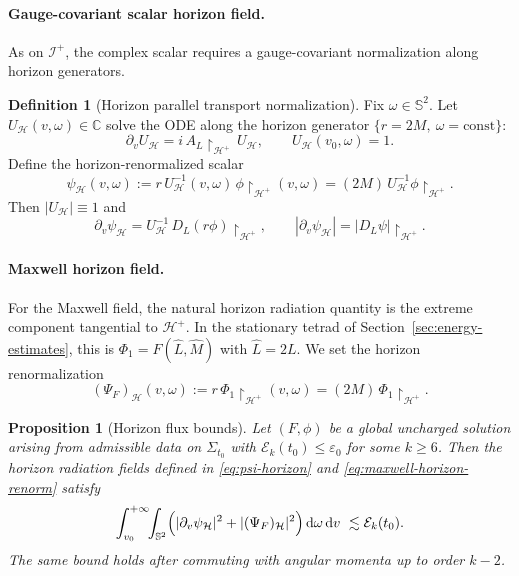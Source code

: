 \documentclass[11pt]{article}
\numberwithin{equation}{section}
\theoremstyle{plain}
\newtheorem{proposition}[theorem]{Proposition}
\theoremstyle{definition}
\newtheorem{definition}{Definition}[section]
\theoremstyle{remark}
\newcommand{\dd}{\mathrm{d}}
\begin{document}
\paragraph{Gauge-covariant scalar horizon field.}
As on $\mathcal I^+$, the complex scalar requires a gauge-covariant normalization along horizon generators.

\begin{definition}[Horizon parallel transport normalization]\label{def:horizon-parallel-transport}
Fix $\omega\in\mathbb S^{2}$.
Let $U_{\mathcal H}(v,\omega)\in\mathbb C$ solve the ODE along the horizon generator $\{r=2M,\ \omega=\mathrm{const}\}$:
\begin{equation}\label{eq:U-horizon}
\partial_v U_{\mathcal H} = i\,A_L\!\restriction_{\mathcal H^+}\,U_{\mathcal H},
\qquad
U_{\mathcal H}(v_0,\omega)=1.
\end{equation}
Define the horizon-renormalized scalar
\begin{equation}\label{eq:psi-horizon}
\psi_{\mathcal H}(v,\omega):= r\,U_{\mathcal H}^{-1}(v,\omega)\,\phi\!\restriction_{\mathcal H^+}(v,\omega)
= (2M)\,U_{\mathcal H}^{-1}\phi\!\restriction_{\mathcal H^+}.
\end{equation}
Then $|U_{\mathcal H}|\equiv 1$ and
\begin{equation}\label{eq:vpsi-horizon}
\partial_v \psi_{\mathcal H} = U_{\mathcal H}^{-1}\,D_L(r\phi)\!\restriction_{\mathcal H^+},
\qquad
|\partial_v\psi_{\mathcal H}| = |D_L\psi|\!\restriction_{\mathcal H^+}.
\end{equation}
\end{definition}

\paragraph{Maxwell horizon field.}
For the Maxwell field, the natural horizon radiation quantity is the extreme component tangential to $\mathcal H^+$.
In the stationary tetrad of Section~\ref{sec:energy-estimates}, this is $\Phi_{1}=F(\hat L,\hat M)$ with $\hat L=2L$.
We set the horizon renormalization
\begin{equation}\label{eq:maxwell-horizon-renorm}
(\Psi_F)_{\mathcal H}(v,\omega):= r\,\Phi_{1}\!\restriction_{\mathcal H^+}(v,\omega)=(2M)\,\Phi_{1}\!\restriction_{\mathcal H^+}.
\end{equation}

\begin{proposition}[Horizon flux bounds]\label{prop:horizon-flux}
Let $(F,\phi)$ be a global uncharged solution arising from admissible data on $\Sigma_{t_0}$ with $\mathcal{E}_k(t_0)\le \varepsilon_0$ for some $k\ge 6$.
Then the horizon radiation fields defined in \eqref{eq:psi-horizon} and \eqref{eq:maxwell-horizon-renorm} satisfy
\begin{equation}\label{eq:horizon-flux}
\int_{v_0}^{+\infty}\!\!\int_{\mathbb S^{2}}
\Bigl(|\partial_v\psi_{\mathcal H}|^{2}+|(\Psi_F)_{\mathcal H}|^{2}\Bigr)\,\dd\omega\,\dd v
\ \lesssim
\mathcal{E}_k(t_0).
\end{equation}
The same bound holds after commuting with angular momenta up to order $k-2$.
\end{proposition}
\end{document}
